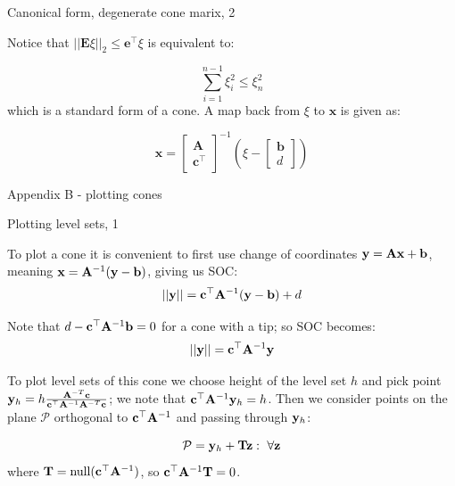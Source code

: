 \documentclass{beamer}
\begin{document}
\begin{frame}{Canonical form, degenerate cone marix, 2}
	\begin{flushleft}
		
		Notice that $||\mathbf{E}\xi||_2 \leq 
		\mathbf{e}^\top \xi$ is equivalent to:
		
		\begin{equation}
			\sum\limits_{i=1}^{n-1}\xi_i^2 \leq \xi_n^2 
		\end{equation}
		which is a standard form of a cone. A map back from $\xi$ to $\mathbf{x}$ is given as:
		
		\begin{equation}
			\mathbf{x} = \begin{bmatrix}
				\mathbf{A} \\ \mathbf{c}^\top
			\end{bmatrix}^{-1}
			\left(
			\xi - 
			\begin{bmatrix}
				\mathbf{b} \\ d
			\end{bmatrix}
			\right)
		\end{equation}
		
	\end{flushleft}
\end{frame}



\begin{frame}
	\centerline{\huge Appendix B - plotting cones}
\end{frame}


\begin{frame}{Plotting level sets, 1}
	\begin{flushleft}
		
		To plot a cone it is convenient to first use change of coordinates $\mathbf{y} = \mathbf{A}\mathbf{x}+\mathbf{b}$, meaning $\mathbf{x} =\mathbf{A}^{-1} (\mathbf{y} - \mathbf{b})$, giving us SOC:
		\begin{equation}
			||\mathbf{y}|| = \mathbf{c}^\top \mathbf{A}^{-1} (\mathbf{y} - \mathbf{b}) + d
		\end{equation}
		
		Note that $d - \mathbf{c}^\top \mathbf{A}^{-1}\mathbf{b} = 0$ for a cone with a tip; so SOC becomes:
		\begin{equation}
			||\mathbf{y}|| = \mathbf{c}^\top \mathbf{A}^{-1} \mathbf{y}
		\end{equation}
		
		To plot level sets of this cone we choose height of the level set $h$ and pick point $\mathbf{y}_h = h \frac{\mathbf{A}^{-T} \mathbf{c}}{\mathbf{c}^\top \mathbf{A}^{-1}\mathbf{A}^{-T} \mathbf{c}}$; we note that $\mathbf{c}^\top \mathbf{A}^{-1} \mathbf{y}_h = h$. Then we consider points on the plane $\mathcal P$ orthogonal to $\mathbf{c}^\top \mathbf{A}^{-1}$ and passing through $\mathbf{y}_h$:
		
		\begin{equation}
			\mathcal P = {\mathbf{y}_h + \mathbf{T}\mathbf{z}: \  \forall \mathbf{z}}
		\end{equation}
		where $\mathbf{T} = \text{null}(\mathbf{c}^\top \mathbf{A}^{-1})$, so $\mathbf{c}^\top \mathbf{A}^{-1} \mathbf{T} = 0$.
		
	\end{flushleft}
\end{frame}
\end{document}
